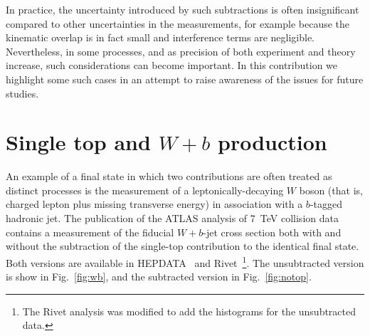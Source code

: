 \documentclass[11pt]{cernrep}
\begin{document}
In practice, the uncertainty introduced by such subtractions is often insignificant compared to other uncertainties in the measurements, 
for example because the kinematic overlap
is in fact small and interference terms are negligible. Nevertheless, in some processes, and as precision of both experiment
and theory increase, such considerations can become important. In this contribution we highlight some such cases in an attempt 
to raise awareness of the issues for future studies. 

\section{Single top and $W+b$ production}

An example of a final state in which two contributions are often treated as distinct processes is the measurement of a 
leptonically-decaying $W$ boson (that is, charged lepton plus missing transverse energy) in association with a $b$-tagged hadronic jet. 
The publication of the ATLAS analysis of 7~TeV collision data\cite{Aad:2013vka} contains a measurement of the fiducial $W+b$-jet 
cross section both with and without the subtraction of the single-top contribution to the identical final state. Both
versions are available in HEPDATA~\cite{hepdata} and Rivet~\cite{Buckley:2010ar}\footnote{The Rivet analysis was modified to add the histograms 
for the unsubtracted data.}. 
The unsubtracted version is show in Fig.~\ref{fig:wb}, and the subtracted version in Fig.~\ref{fig:notop}. 
\end{document}
